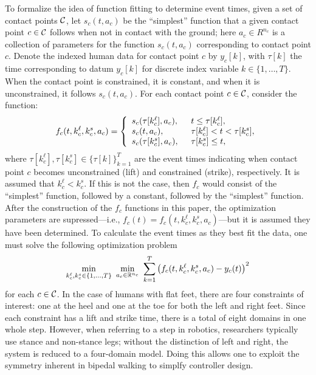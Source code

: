 To formalize the idea of function fitting to determine event times, given a set of contact points $\mathcal{C}$, let $s_{c}(t, a_{c})$ be the ``simplest'' function that a given contact point $c \in \mathcal{C}$ follows when not in contact with the ground; here $a_{c} \in R^{n_{c}}$ is a collection of parameters for the function $s_{c}(t, a_{c})$ corresponding to contact point $c$. Denote the indexed human data for contact point $c$ by $y_{c}[k]$, with $\tau[k]$ the time corresponding to datum $y_{c}[k]$ for discrete index variable $k \in \{1,\ldots,T\}$. When the contact point is constrained, it is constant, and when it is unconstrained, it follows $s_{c}(t, a_{c})$. For each contact point $c \in \mathcal{C}$, consider the function:
\begin{align}
  f_{c}(t, k_{c}^{\ell}, k_{c}^{s}, a_{c}) =  \left\{\begin{array}{l l}
    s_{c}(\tau[k_{c}^{\ell}], a_{c}), & \hspace{2mm} t \leq  \tau[k_{c}^{\ell}],\\
    s_{c}(t, a_{c}), & \hspace{2mm} \tau[k_{c}^{\ell}] < t < \tau[k_{c}^{s}],\\
    s_{c}(\tau[k_{c}^{s}], a_{c}), & \hspace{2mm} \tau[k_{c}^{s}] \leq t,\\
  \end{array} \right.
\end{align}
where $\tau[k_{c}^{\ell}], \tau[k_{c}^{s}] \in \{\tau[k]\}_{k = 1}^{T}$ are the event times indicating when contact point $c$ becomes unconstrained (lift) and constrained (strike), respectively. It is assumed that $k_{c}^{\ell} < k_{c}^{s}$. If this is not the case, then $f_{c}$ would consist of the ``simplest'' function, followed by a constant, followed by the ``simplest'' function. After the construction of the $f_{c}$ functions in this paper, the optimization parameters are supressed---i.e., $f_{c}(t) = f_{c}(t, k_{c}^{\ell}, k_{c}^{s}, a_{c})$---but it is assumed they have been determined. To calculate the event times as they best fit the data, one must solve the following optimization problem
\begin{align}
  \min_{k_{c}^{\ell}, k_{c}^{s} \in \{1, \ldots, T\}} \ \min_{a_{c} \in \mathbb{R}^{n_{c}}} \ \sum_{k = 1}^{T} \left( f_{c}(t,k_{c}^{\ell},k_{c}^{s},a_{c}) - y_{c}(t) \right)^2
\end{align}
for each $c \in \mathcal{C}$. In the case of humans with flat feet, there are four constraints of interest: one at the heel and one at the toe for both the left and right feet. Since each constraint has a lift and strike time, there is a total of eight domains in one whole step. However, when referring to a step in robotics, researchers typically use stance and non-stance legs; without the distinction of left and right, the system is reduced to a four-domain model. Doing this allows one to exploit the symmetry inherent in bipedal walking to simplfy controller design.

